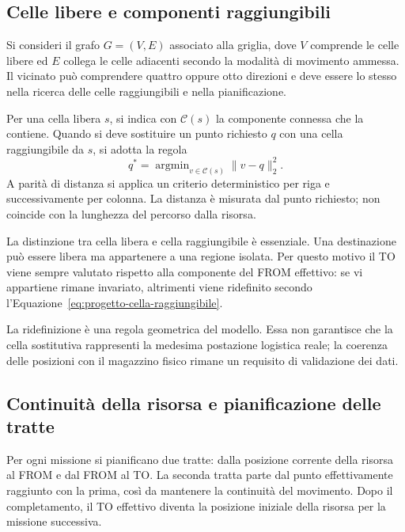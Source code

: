 \subsection{Celle libere e componenti raggiungibili}

Si consideri il grafo $G=(V,E)$ associato alla griglia, dove $V$ comprende le
celle libere ed $E$ collega le celle adiacenti secondo la modalità di movimento
ammessa. Il vicinato può comprendere quattro oppure otto direzioni e deve
essere lo stesso nella ricerca delle celle raggiungibili e nella pianificazione.

Per una cella libera $s$, si indica con $\mathcal C(s)$ la componente connessa
che la contiene. Quando si deve sostituire un punto richiesto $q$ con una
cella raggiungibile da $s$, si adotta la regola
\begin{equation}
    q^*=\mathop{\arg\min}_{v\in\mathcal C(s)}\|v-q\|_2^2.
    \label{eq:progetto-cella-raggiungibile}
\end{equation}
A parità di distanza si applica un criterio deterministico per riga e
successivamente per colonna. La distanza è misurata dal punto richiesto;
non coincide con la lunghezza del percorso dalla risorsa.

La distinzione tra cella libera e cella raggiungibile è essenziale. Una
destinazione può essere libera ma appartenere a una regione isolata. Per
questo motivo il TO viene sempre valutato rispetto alla componente del FROM
effettivo: se vi appartiene rimane invariato, altrimenti viene ridefinito
secondo l'Equazione~\ref{eq:progetto-cella-raggiungibile}.

La ridefinizione è una regola geometrica del modello. Essa non garantisce
che la cella sostitutiva rappresenti la medesima postazione logistica reale;
la coerenza delle posizioni con il magazzino fisico rimane un requisito di
validazione dei dati.

\subsection{Continuità della risorsa e pianificazione delle tratte}

Per ogni missione si pianificano due tratte: dalla posizione corrente della
risorsa al FROM e dal FROM al TO. La seconda tratta parte dal punto
effettivamente raggiunto con la prima, così da mantenere la continuità del
movimento. Dopo il completamento, il TO effettivo diventa la posizione
iniziale della risorsa per la missione successiva.

